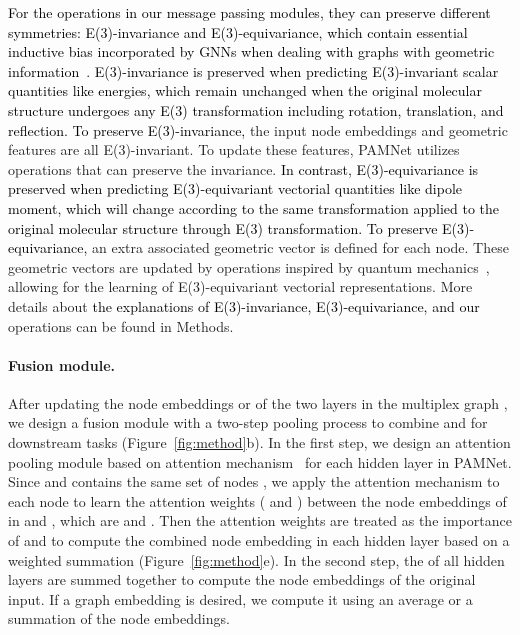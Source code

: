 \documentclass[fleqn,10pt]{wlscirep}
\newcommand{\method}{PAMNet\xspace}
\begin{document}
\textcolor{black}{For the operations in our message passing modules, they can preserve different symmetries: E(3)-invariance and E(3)-equivariance, which contain essential inductive bias incorporated by GNNs when dealing with graphs with geometric information~\cite{han2022geometrically}. E(3)-invariance is preserved when predicting E(3)-invariant scalar quantities like energies, which remain unchanged when the original molecular structure undergoes any E(3) transformation including rotation, translation, and reflection. To preserve E(3)-invariance,} the input node embeddings  and geometric features are all E(3)-invariant. To update these features, \method utilizes operations that can preserve the invariance. \textcolor{black}{In contrast, E(3)-equivariance is preserved when predicting E(3)-equivariant vectorial quantities like dipole moment, which will change according to the same transformation applied to the original molecular structure through E(3) transformation. To preserve E(3)-equivariance,} an extra associated geometric vector  is defined for each node. These geometric vectors are updated by operations inspired by quantum mechanics~\cite{stone1981distributed}, allowing for the learning of E(3)-equivariant vectorial representations. More details about \textcolor{black}{the explanations of E(3)-invariance, E(3)-equivariance, and our} operations can be found in Methods.

\paragraph{Fusion module.}
After updating the node embeddings  or  of the two layers in the multiplex graph , we design a fusion module with a two-step pooling process to combine  and  for downstream tasks (Figure~\ref{fig:method}b). In the first step, we design an attention pooling module based on attention mechanism~\cite{velivckovic2018graph} for each hidden layer  in \method. Since  and  contains the same set of nodes , we apply the attention mechanism to each node  to learn the attention weights ( and ) between the node embeddings of  in  and , which are  and . Then the attention weights are treated as the importance of  and  to compute the combined node embedding  in each hidden layer  based on a weighted summation (Figure~\ref{fig:method}e). In the second step, the  of all hidden layers are summed together to compute the node embeddings of the original input. If a graph embedding is desired, we compute it using an average or a summation of the node embeddings. 
\end{document}
